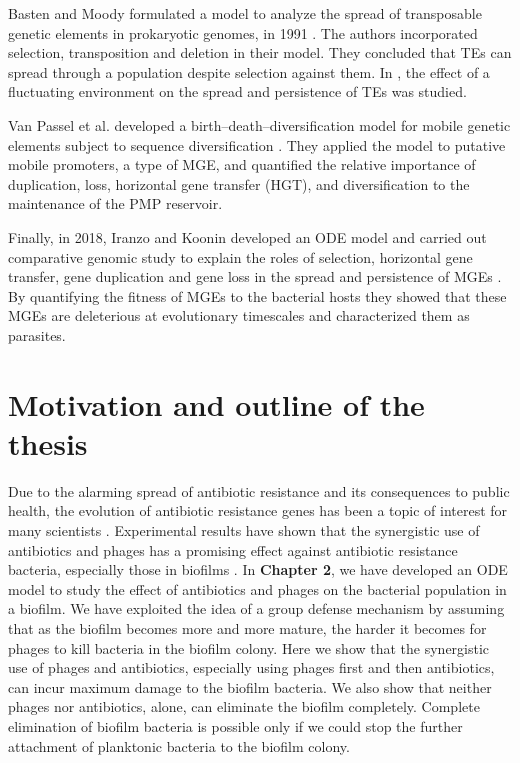 Basten and Moody formulated a model to analyze the spread of transposable genetic elements in prokaryotic genomes, in 1991 \cite{basten_branching-process_1991}.  The authors incorporated selection, transposition and deletion in their model. They concluded that TEs can spread through a population despite selection against them. In \cite{edwards_transiently_2003}, the effect of  a fluctuating environment on the spread and persistence of TEs was studied.  

Van Passel et al. developed a birth–death–diversification model for mobile genetic elements subject to sequence diversification \cite{van_passel_birth_2014}. They applied the model to putative mobile promoters, a type of MGE,  and quantified the relative importance of duplication, loss, horizontal gene transfer (HGT), and diversification to the maintenance of the PMP reservoir.

Finally, in 2018, Iranzo and Koonin developed an ODE model and carried out comparative genomic study to explain the roles of selection, horizontal gene transfer, gene duplication and gene loss in the spread and persistence of MGEs \cite{iranzo_how_2018}. By quantifying the fitness of MGEs to the bacterial hosts they showed that these MGEs are deleterious at evolutionary timescales and characterized them as parasites. 

\section{Motivation and outline of the thesis}
Due to the alarming spread of antibiotic resistance and its consequences to public health, the evolution of antibiotic resistance genes has been a topic of interest for many scientists \cite{ hong_comprehensive_2018}. Experimental results have shown that the synergistic use of antibiotics and phages has a promising effect against antibiotic resistance bacteria, especially those in biofilms \cite{chaudhry_synergy_2017}. In \textbf{Chapter 2}, we have developed an ODE model to study the effect of antibiotics and phages on the bacterial population in a biofilm. We have exploited the idea of a group defense mechanism by assuming that as the biofilm becomes more and more mature, the harder it becomes for phages to kill bacteria in the biofilm colony. Here we show that the synergistic use of phages and antibiotics, especially using phages first and then antibiotics, can incur maximum damage to the biofilm bacteria. We also show that neither phages nor antibiotics, alone,  can eliminate the biofilm completely. Complete elimination of biofilm bacteria is possible only if we could stop the further attachment of planktonic bacteria to the biofilm colony.


